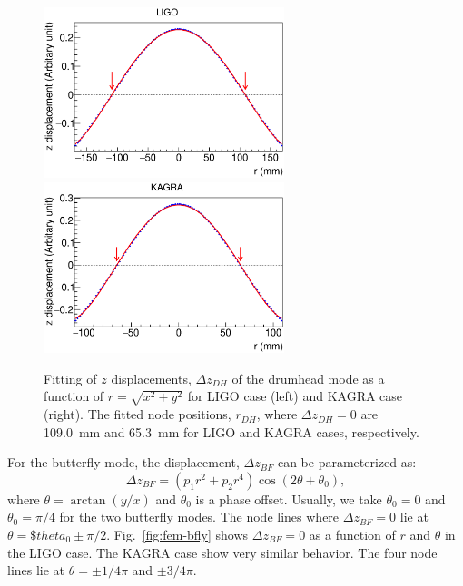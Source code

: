 \begin{figure}
\begin{center}
\includegraphics[width=7cm]{Figures/fem-nfit1.eps}
\includegraphics[width=7cm]{Figures/fem-nfit2.eps}
\caption{Fitting of $z$ displacements, $\Delta z_{DH}$ of the drumhead mode 
as a function of $r=\sqrt{x^2+y^2}$ for 
LIGO case (left) and KAGRA case (right). 
The fitted node positions, $r_{DH}$, where $\Delta z_{DH}=0$ 
are 109.0~mm and 65.3~mm for LIGO and KAGRA cases, respectively.} 
\label{fig:fem-dnode}
\end{center}
\end{figure}

For the butterfly mode, the displacement, $\Delta z_{BF}$ 
can be parameterized as:
\begin{equation}
\label{eq:fem-butt}
\Delta z_{BF} = (p_1 r^2+p_2 r^4)\cos(2\theta+\theta_0),
\end{equation}
where $\theta=\arctan(y/x)$ and $\theta_0$ is a phase offset.
Usually, we take $\theta_0=0$ and $\theta_0=\pi/4$ for 
the two butterfly modes. The node lines where $\Delta z_{BF}=0$ lie 
at $\theta=\$theta_0\pm\pi/2$. Fig.~\ref{fig:fem-bfly} shows 
$\Delta z_{BF}=0$ as a function of $r$ and $\theta$ in the LIGO case.
The KAGRA case show very similar behavior.
The four node lines lie at $\theta=\pm1/4\pi$ and $\pm3/4\pi$.

